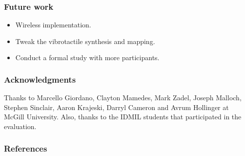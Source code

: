 \documentclass{beamer}
\begin{document}
\begin{frame}
\frametitle{Future work}

\begin{itemize}[<+->]
	\item Wireless implementation.
	\item Tweak the vibrotactile synthesis and mapping.%
	\item Conduct a formal study with more participants.%
\end{itemize}

\end{frame}


\begin{frame}
\frametitle{Acknowledgments}

Thanks to Marcello Giordano, Clayton Mamedes, Mark Zadel, Joseph Malloch, Stephen Sinclair, Aaron Krajeski, Darryl Cameron and Avrum Hollinger at McGill University. Also, thanks to the IDMIL students that participated in the evaluation.


\end{frame}



\begin{frame}[allowframebreaks]
\frametitle{References}
		\begin{footnotesize}
		
        
        
		\end{footnotesize}
\end{frame}
\end{document}
